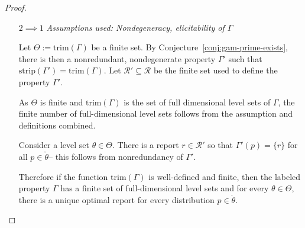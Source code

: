 \documentclass[12pt]{article}
\newcommand{\E}{\mathbb{E}}
\newcommand{\R}{\mathcal{R}}
\newcommand{\inter}[1]{\mathring{#1}}%
\newcommand{\trim}{\mathrm{trim}}
\newcommand{\strip}{\text{strip}}
\DeclareMathOperator*{\argmin}{arg\,min}
\begin{document}
\begin{proof}
\begin{enumerate}
%
%
%



\item[$2 \implies 1$]  
\emph{Assumptions used: Nondegeneracy, elicitability of $\Gamma$}

Let $\Theta := \trim(\Gamma)$ be a finite set.
By Conjecture~\ref{conj:gam-prime-exists}, there is then a nonredundant, nondegenerate property $\Gamma'$ such that $\strip(\Gamma') = \trim(\Gamma)$.
Let $\R' \subseteq \R$ be the finite set used to define the property $\Gamma'$.

As $\Theta$ is finite and $\trim(\Gamma)$ is the set of full dimensional level sets of $\Gamma$, the finite number of full-dimensional level sets follows from the assumption and definitions combined.

Consider a level set $\theta\in \Theta$.
There is a report $r \in \R'$ so that $\Gamma'(p) = \{r\}$ for all $p \in \inter{\theta}$-- this follows from nonredundancy of $\Gamma'$.

Therefore if the function $\trim(\Gamma)$ is well-defined and finite, then the labeled property $\Gamma$ has a finite set of full-dimensional level sets and for every $\theta \in \Theta$, there is a unique optimal report for every distribution $p \in \inter{\theta}$.



\end{enumerate}
\end{proof}
\end{document}
